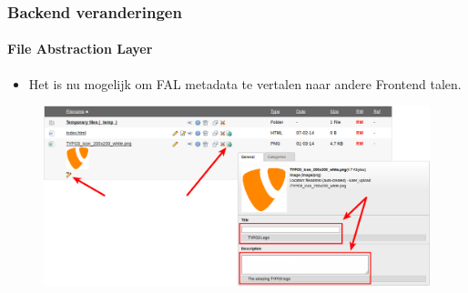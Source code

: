 
\begin{frame}[fragile]
	\frametitle{Backend veranderingen}
	\framesubtitle{File Abstraction Layer}

	\begin{itemize}
		\item Het is nu mogelijk om FAL metadata te vertalen naar andere Frontend talen.
	\end{itemize}

	\begin{figure}
		\includegraphics[width=0.95\linewidth]{Images/BackendChanges/FalTranslateMetaData.png}
	\end{figure}

\end{frame}


